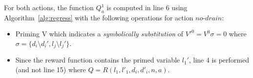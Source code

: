 For both actions, the function $Q^1_a$ is computed in line 6 using Algorithm~\ref{alg:regress} with the following operations for action $\mathit{no}$-$\mathit{drain}$:
\begin{itemize}

\item Priming V which %
indicates a \emph{symbolically substitution} of  $V'^0= V^0 \sigma = 0$ where $\sigma = \lbrace d_i \setminus d_i' , l_j \setminus l_j' \rbrace$.%

\item Since the reward function contains the primed variable $l_1'$, line 4 is performed (and not line 15) where $Q = R(l_1,l'_1,d_i,d'_i,n,a) $. 


\end{itemize}
